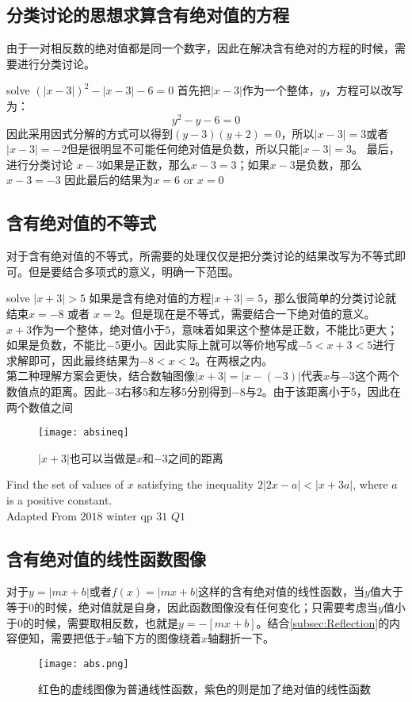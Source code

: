 \subsection*{分类讨论的思想求算含有绝对值的方程}
由于一对相反数的绝对值都是同一个数字，因此在解决含有绝对的方程的时候，需要进行分类讨论。

\begin{ExampleBox}
 solve $\left(|x-3|\right)^2-|x-3|-6=0$
 \tcblower
 首先把$|x-3|$作为一个整体，$y$，方程可以改写为：
 \[
 	y^2-y-6=0
 \]
 因此采用因式分解的方式可以得到$(y-3)(y+2)=0$，所以$|x-3|=3$或者$|x-3|=-2$但是很明显不可能任何绝对值是负数，所以只能$|x-3|=3$。
 最后，进行分类讨论
 $x-3$如果是正数，那么$x-3=3$；如果$x-3$是负数，那么$x-3=-3$
 因此最后的结果为$x=6$ or $x=0$
\end{ExampleBox}

\subsection*{含有绝对值的不等式}
对于含有绝对值的不等式，所需要的处理仅仅是把分类讨论的结果改写为不等式即可。但是要结合多项式的意义，明确一下范围。
\begin{ExampleBox}
 solve $|x+3|>5$
 \tcblower
 如果是含有绝对值的方程$|x+3|=5$，那么很简单的分类讨论就结束$x=-8$ 或者 $x=2$。但是现在是不等式，需要结合一下绝对值的意义。\\
 $x+3$作为一个整体，绝对值小于$5$，意味着如果这个整体是正数，不能比$5$更大；如果是负数，不能比$-5$更小。因此实际上就可以等价地写成$-5<x+3<5$进行求解即可，因此最终结果为$-8<x<2$。在两根之内。\\

 第二种理解方案会更快，结合数轴图像$|x+3|=|x-(-3)|$代表$x$与$-3$这个两个数值点的距离。因此$-3$右移$5$和左移$5$分别得到$-8$与$2$。由于该距离小于5，因此在两个数值之间
 \begin{figure}[H]
 \centering
 \texttt{[image: absineq]}
 \caption{$|x+3|$也可以当做是$x$和$-3$之间的距离}
 \end{figure} 
\end{ExampleBox}


\begin{TaskBox}
Find the set of values of $x$ satisfying the inequality $2|2x-a|<|x+3a|$, where $a$ is a positive constant.\\
\makebox{}\hfill Adapted From $2018$ winter qp $31$ $Q1$
\end{TaskBox}

\subsection*{含有绝对值的线性函数图像}
对于$y=|mx+b|$或者$f(x)=|mx+b|$这样的含有绝对值的线性函数，当$y$值大于等于0的时候，绝对值就是自身，因此函数图像没有任何变化；只需要考虑当$y$值小于0的时候，需要取相反数，也就是$y=-[mx+b]$。结合\ref{subsec:Reflection}的内容便知，需要把低于$x$轴下方的图像绕着$x$轴翻折一下。
\begin{figure}[H]
\centering
\texttt{[image: abs.png]}
\caption{红色的虚线图像为普通线性函数，紫色的则是加了绝对值的线性函数}
\end{figure}

